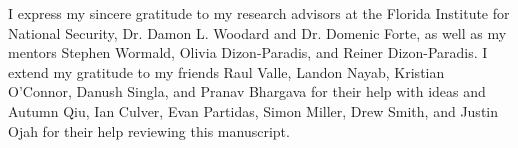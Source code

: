 
I express my sincere gratitude to my research advisors at the Florida Institute for National Security, Dr. Damon L. Woodard and Dr. Domenic Forte, as well as my mentors Stephen Wormald, Olivia Dizon-Paradis, and Reiner Dizon-Paradis. I extend my gratitude to my friends Raul Valle, Landon Nayab, Kristian O'Connor, Danush Singla, and Pranav Bhargava for their help with ideas and Autumn Qiu, Ian Culver, Evan Partidas, Simon Miller, Drew Smith, and Justin Ojah for their help reviewing this manuscript. 